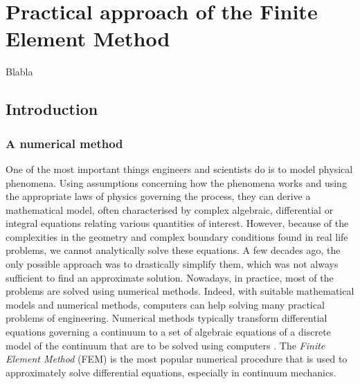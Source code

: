 \chapter{Practical approach of the Finite Element Method}
\label{chap3}
\begin{shortAbstract}
Blabla
\end{shortAbstract}


\section{Introduction}

	\subsection{A numerical method}
One of the most important things engineers and scientists do is to model physical phenomena. Using assumptions concerning how the phenomena works and using the appropriate laws of physics governing the process, they can derive a mathematical model, often characterised by complex algebraic, differential or integral equations relating various quantities of interest. However, because of the complexities in the geometry and complex boundary conditions found in real life problems, we cannot analytically solve these equations. A few decades ago, the only possible approach was to drastically simplify them, which was not always sufficient to find an approximate solution. Nowadays, in practice, most of the problems are solved using numerical methods. Indeed, with suitable mathematical models and numerical methods, computers can help solving many practical problems of engineering. Numerical methods typically transform differential equations governing a continuum to a set of algebraic equations of a discrete model of the continuum that are to be solved using computers \citep{Reddy93}. The \emph{Finite Element Method} (FEM) is the most popular numerical procedure that is used to approximately solve differential equations, especially in continuum mechanics. 
	
